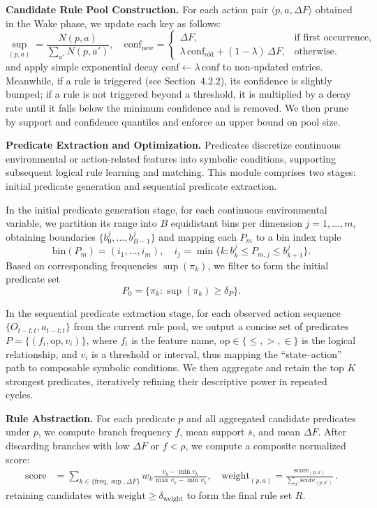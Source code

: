 \textbf{Candidate Rule Pool Construction.} For each action pair $\langle p,a,\Delta F\rangle$ obtained in the Wake phase, we update each key as follows:
\[
\sup_{(p,a)} = \frac{N(p,a)}{\sum_{a'}N(p,a')},\quad
\mathrm{conf}_{\mathrm{new}} =
\begin{cases}
   \Delta F, & \text{if first occurrence},\\
   \lambda\,\mathrm{conf}_{\mathrm{old}}+(1-\lambda)\,\Delta F,
      & \text{otherwise}.
\end{cases}
\]
and apply simple exponential decay $\mathrm{conf}\leftarrow \lambda\,\mathrm{conf}$ to non-updated entries. Meanwhile, if a rule is triggered (see Section~4.2.2), its confidence is slightly bumped; if a rule is not triggered beyond a threshold, it is multiplied by a decay rate until it falls below the minimum confidence and is removed. We then prune by support and confidence quantiles and enforce an upper bound on pool size.

\textbf{Predicate Extraction and Optimization.} Predicates discretize continuous environmental or action-related features into symbolic conditions, supporting subsequent logical rule learning and matching. This module comprises two stages: initial predicate generation and sequential predicate extraction.

In the initial predicate generation stage, for each continuous environmental variable, we partition its range into $B$ equidistant bins per dimension $j=1,\dots,m$, obtaining boundaries $\{b_{0}^{j},\dots,b_{B-1}^{j}\}$ and mapping each $P_{m}$ to a bin index tuple
\[
\mathrm{bin}(P_{m})=(i_{1},\dots,i_{m}),\quad i_{j}=\min\{k:b_{k}^{j}\le P_{m,j}\le b_{k+1}^{j}\}.
\]
Based on corresponding frequencies $\sup(\pi_{k})$, we filter to form the initial predicate set
\[
P_{0}=\{\pi_{k}:\sup(\pi_{k})\ge \delta_{P}\}.
\]

In the sequential predicate extraction stage, for each observed action sequence $\{O_{t-l:t},a_{t-l:t}\}$ from the current rule pool, we output a concise set of predicates $P=\{(f_{i},\mathrm{op},v_{i})\}$, where $f_{i}$ is the feature name, $\mathrm{op}\in\{\le,>,\in\}$ is the logical relationship, and $v_{i}$ is a threshold or interval, thus mapping the “state–action” path to composable symbolic conditions. We then aggregate and retain the top $K$ strongest predicates, iteratively refining their descriptive power in repeated cycles.

\textbf{Rule Abstraction.} For each predicate $p$ and all aggregated candidate predicates under $p$, we compute branch frequency $f$, mean support $\bar{s}$, and mean $\Delta F$. After discarding branches with low $\Delta F$ or $f<\rho$, we compute a composite normalized score:
\[
\begin{aligned}
  \mathrm{score}
    &= \sum_{k\in\{\mathrm{freq},\sup,\Delta F\}}
       w_k \frac{v_k-\min v_k}{\max v_k-\min v_k},\quad
  \mathrm{weight}_{(p,a)}
    = \frac{\mathrm{score}_{(p,a)}}
           {\sum_{a'}\mathrm{score}_{(p,a')}}\,. 
\end{aligned}
\]
retaining candidates with $\mathrm{weight}\ge \delta_{\mathrm{weight}}$ to form the final rule set $R$.


